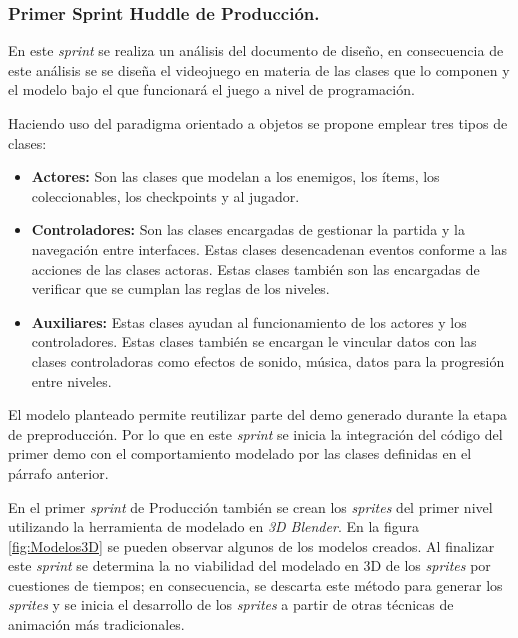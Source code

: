 \subsubsection{Primer Sprint Huddle de Producción.}
En este \textit{sprint} se realiza un análisis del documento de diseño, en consecuencia
de este análisis se se diseña el videojuego en materia de las clases que lo
componen y el modelo bajo el que funcionará el juego a nivel de programación.
\\
\par
Haciendo uso del paradigma orientado a objetos se propone emplear tres tipos
de clases:
\begin{itemize}
        \item \textbf{Actores:} Son las clases que modelan a los enemigos, los ítems,
        los coleccionables, los checkpoints y al jugador.
        \item \textbf{Controladores:} Son las clases encargadas de gestionar la partida
        y la navegación entre interfaces. Estas clases desencadenan eventos conforme a
        las acciones de las clases actoras. Estas clases también son las encargadas de
        verificar que se cumplan las reglas de los niveles.
        \item \textbf{Auxiliares:} Estas clases ayudan al funcionamiento de los actores
        y los controladores. Estas clases también se encargan le vincular datos con
        las clases controladoras como efectos de sonido, música, datos para la
        progresión entre niveles.
\end{itemize}
El modelo planteado permite reutilizar parte del demo generado durante la etapa
de preproducción. Por lo que en este \textit{sprint} se inicia la integración
del código del primer demo con el comportamiento modelado por las clases definidas
en el párrafo anterior.
\\
\par
En el primer \textit{sprint} de Producción también se crean los \textit{sprites} del
primer nivel utilizando la herramienta de modelado en \textit{3D Blender}. En la
figura \ref{fig:Modelos3D} se pueden observar algunos de los modelos creados. Al
finalizar este \textit{sprint} se determina la no viabilidad del modelado en 3D de los
\textit{sprites} por cuestiones de tiempos; en consecuencia, se descarta este
método para generar los \textit{sprites} y se inicia el desarrollo de los
\textit{sprites} a partir de otras técnicas de animación más tradicionales.

